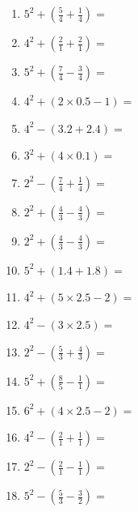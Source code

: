 \documentclass[12pt]{article}
\begin{document}
\begin{enumerate}
\newpage
\item \large $ 5^{2} + (\frac{5}{4} + \frac{1}{4}) = $ \vspace{1.4cm}
\item \large $ 4^{2} + (\frac{2}{1} + \frac{2}{1}) = $ \vspace{1.4cm}
\item \large $ 5^{2} + (\frac{7}{4} - \frac{3}{4}) = $ \vspace{1.4cm}
\item \large $ 4^{2} + (2 \times 0.5 - 1) = $ \vspace{1.4cm}
\item \large $ 4^{2} - (3.2 + 2.4) = $ \vspace{1.4cm}
\item \large $ 3^{2} + (4 \times 0.1) = $ \vspace{1.4cm}
\item \large $ 2^{2} - (\frac{7}{4} + \frac{1}{4}) = $ \vspace{1.4cm}
\item \large $ 2^{2} + (\frac{4}{3} - \frac{4}{3}) = $ \vspace{1.4cm}
\item \large $ 2^{2} + (\frac{4}{3} - \frac{4}{3}) = $ \vspace{1.4cm}
\item \large $ 5^{2} + (1.4 + 1.8) = $ \vspace{1.4cm}
\newpage
\item \large $ 4^{2} + (5 \times 2.5 - 2) = $ \vspace{1.4cm}
\item \large $ 4^{2} - (3 \times 2.5) = $ \vspace{1.4cm}
\item \large $ 2^{2} - (\frac{5}{3} + \frac{4}{3}) = $ \vspace{1.4cm}
\item \large $ 5^{2} + (\frac{8}{5} - \frac{1}{1}) = $ \vspace{1.4cm}
\item \large $ 6^{2} + (4 \times 2.5 - 2) = $ \vspace{1.4cm}
\item \large $ 4^{2} - (\frac{2}{1} + \frac{1}{1}) = $ \vspace{1.4cm}
\item \large $ 2^{2} - (\frac{2}{1} - \frac{1}{1}) = $ \vspace{1.4cm}
\item \large $ 5^{2} - (\frac{5}{3} - \frac{3}{2}) = $ \vspace{1.4cm}

\end{enumerate}
\end{document}
